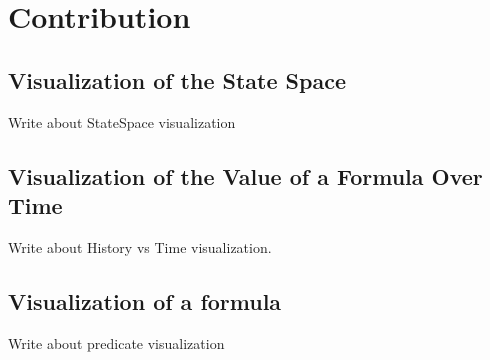 \section{Contribution}

\subsection{Visualization of the State Space}

Write about StateSpace visualization

\subsection{Visualization of the Value of a Formula Over Time}

Write about History vs Time visualization.

\subsection{Visualization of a formula}

Write about predicate visualization
